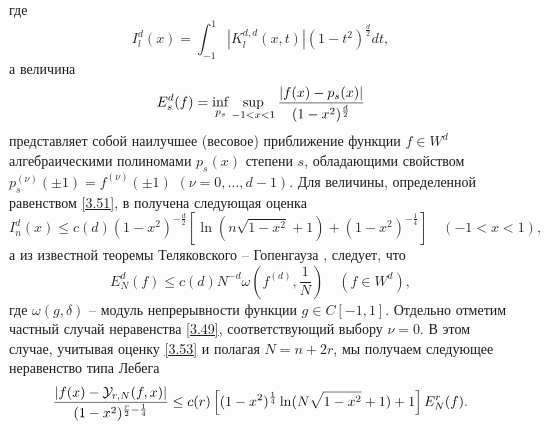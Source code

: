 где
\begin{equation}\label{3.51}
I^{d}_{l}(x)= \int_{-1}^{1}|K^{d,d}_{l}(x,t)|(1-t^2)^{\frac{d}{2}}dt,
\end{equation}
а величина
\begin{equation}\label{3.52}
E_s^d(f)=\inf_{p_s}\sup_{-1<x<1}{|f(x)-p_s(x)|\over (1-x^2)^\frac{d}{2}}
\end{equation}
представляет собой наилучшее (весовое) приближение функции $f\in W^d$ алгебраическими полиномами $p_s(x)$ степени
$s$, обладающими свойством $p_s^{(\nu)}(\pm1)=f^{(\nu)}(\pm1)$ $(\nu=0,\ldots, d-1)$. Для величины, определенной равенством  \eqref{3.51}, в \cite{Shar15} получена следующая оценка
\begin{equation}\label{3.53}
I^d_n(x)\le c(d)(1-x^2)^{-\frac{d}{2}}\left[\ln(n\sqrt{1-x^2}+1)+(1-x^2)^{-\frac14}\right]\quad(-1<x<1),
\end{equation}
а из известной теоремы Теляковского -- Гопенгауза \cite{TEL},\cite{GOP} следует, что
\begin{equation}\label{3.54}
E_N^d(f)\le c(d)N^{-d}\omega(f^{(d)},\frac{1}{N})\quad (f\in W^d),
\end{equation}
где $\omega(g,\delta)$ -- модуль непрерывности функции $g\in C[-1,1]$. Отдельно отметим частный случай неравенства \eqref{3.49}, соответствующий выбору $\nu=0$. В этом случае,  учитывая оценку \eqref{3.53} и полагая $N=n+2r$, мы получаем следующее неравенство типа Лебега
\begin{equation}\label{3.55}
{\left|f(x)-\mathcal{ Y}_{r,N}(f,x)\right|
\over(1-x^2)^{\frac{r}{2}-\frac14}}\le c(r)\left[(1-x^2)^{\frac14}\ln(N\sqrt{1-x^2}+1)+1\right]E^{r}_{N}(f).
  \end{equation}
